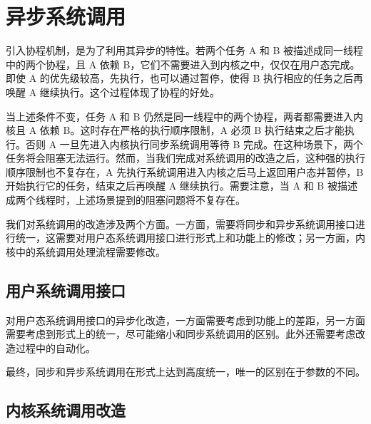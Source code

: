 \section{异步系统调用}

引入协程机制，是为了利用其异步的特性。若两个任务 A 和 B 被描述成同一线程中的两个协程，且 A 依赖 B，它们不需要进入到内核之中，仅仅在用户态完成。即使 A 的优先级较高，先执行，也可以通过暂停，使得 B 执行相应的任务之后再唤醒 A 继续执行。这个过程体现了协程的好处。

当上述条件不变，任务 A 和 B 仍然是同一线程中的两个协程，两者都需要进入内核且 A 依赖 B。这时存在严格的执行顺序限制，A 必须 B 执行结束之后才能执行。否则 A 一旦先进入内核执行同步系统调用等待 B 完成。在这种场景下，两个任务将会阻塞无法运行。然而，当我们完成对系统调用的改造之后，这种强的执行顺序限制也不复存在，A 先执行系统调用进入内核之后马上返回用户态并暂停，B 开始执行它的任务，结束之后再唤醒 A 继续执行。需要注意，当 A 和 B 被描述成两个线程时，上述场景提到的阻塞问题将不复存在。

我们对系统调用的改造涉及两个方面。一方面，需要将同步和异步系统调用接口进行统一，这需要对用户态系统调用接口进行形式上和功能上的修改；另一方面，内核中的系统调用处理流程需要修改。

\subsection{用户系统调用接口}

对用户态系统调用接口的异步化改造，一方面需要考虑到功能上的差距，另一方面需要考虑到形式上的统一，尽可能缩小和同步系统调用的区别。此外还需要考虑改造过程中的自动化。



最终，同步和异步系统调用在形式上达到高度统一，唯一的区别在于参数的不同。

\subsection{内核系统调用改造}

